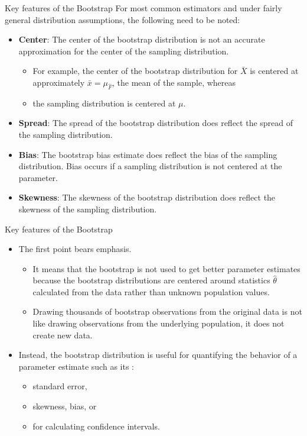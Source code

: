\documentclass[
  ignorenonframetext,
]{beamer}
\providecommand{\tightlist}{%
  \setlength{\itemsep}{0pt}\setlength{\parskip}{0pt}}
\begin{document}
\begin{frame}{Key features of the Bootstrap}
\protect\hypertarget{key-features-of-the-bootstrap-1}{}
For most common estimators and under fairly general distribution
assumptions, the following need to be noted:

\begin{itemize}
\item
  \textbf{Center}: The center of the bootstrap distribution is not an
  accurate approximation for the center of the sampling distribution.

  \begin{itemize}
  \tightlist
  \item
    For example, the center of the bootstrap distribution for
    \(\bar{X}\) is centered at approximately \(\bar{x}=\mu_{\hat{F}}\),
    the mean of the sample, whereas
  \item
    the sampling distribution is centered at \(\mu\).
  \end{itemize}
\item
  \textbf{Spread}: The spread of the bootstrap distribution does reflect
  the spread of the sampling distribution.
\item
  \textbf{Bias}: The bootstrap bias estimate does reflect the bias of
  the sampling distribution. Bias occurs if a sampling distribution is
  not centered at the parameter.
\item
  \textbf{Skewness}: The skewness of the bootstrap distribution does
  reflect the skewness of the sampling distribution.
\end{itemize}
\end{frame}

\begin{frame}{Key features of the Bootstrap}
\protect\hypertarget{key-features-of-the-bootstrap-2}{}
\begin{itemize}
\item
  The first point bears emphasis.

  \begin{itemize}
  \tightlist
  \item
    It means that the bootstrap is not used to get better parameter
    estimates because the bootstrap distributions are centered around
    statistics \(\hat{\theta}\) calculated from the data rather than
    unknown population values.
  \item
    Drawing thousands of bootstrap observations from the original data
    is not like drawing observations from the underlying population, it
    does not create new data.
  \end{itemize}
\item
  Instead, the bootstrap distribution is useful for quantifying the
  behavior of a parameter estimate such as its :

  \begin{itemize}
  \tightlist
  \item
    standard error,
  \item
    skewness, bias, or
  \item
    for calculating confidence intervals.
  \end{itemize}
\end{itemize}
\end{frame}
\end{document}
